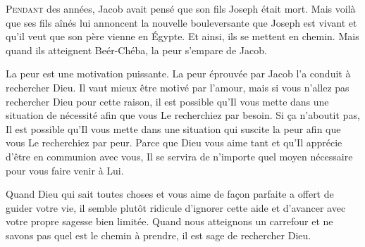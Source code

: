 





\lettrine{P}{endant} des années,
 Jacob avait pensé que son fils Joseph était mort.
 Mais voilà que ses fils aînés lui annoncent la nouvelle bouleversante
 que Joseph est vivant et qu'il veut que son père vienne en Égypte.
 Et ainsi, ils se mettent en chemin.
 Mais quand ils atteignent Beér-Chéba, la peur s'empare de Jacob. 

La peur est une motivation puissante.
 La peur éprouvée par Jacob l'a conduit à rechercher Dieu.
 Il vaut mieux être motivé par l'amour,
 mais si vous n'allez pas rechercher Dieu pour cette raison,
 il est possible qu'Il vous mette dans une situation de nécessité
 afin que vous Le recherchiez par besoin.
 Si \c{c}a n'aboutit pas, Il est possible qu'Il vous mette
 dans une situation qui suscite la peur afin que vous Le recherchiez par peur.
 Parce que Dieu vous aime tant et qu'Il apprécie d'être en communion avec vous,
 Il se servira de n'importe quel moyen nécessaire pour vous faire venir à Lui.


Quand Dieu \ocadr{}qui sait toutes choses et vous aime de fa\c{c}on parfaite\fcadr{}
 a offert de guider votre vie, il semble plutôt ridicule d'ignorer
 cette aide et d'avancer avec votre propre sagesse bien limitée.
 Quand nous atteignons un carrefour et ne savons pas
 quel est le chemin à prendre, il est sage de rechercher Dieu. 

\dvrule



